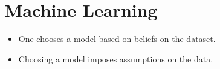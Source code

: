 \section[][customSectionColor]{Machine Learning}


\begin{itemize}
    \item One chooses a model based on beliefs on the dataset.
    \item Choosing a model imposes assumptions on the data.
\end{itemize}